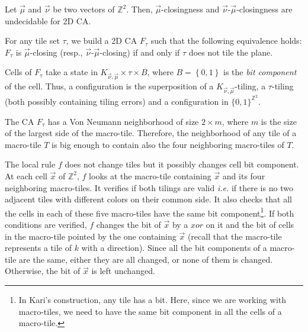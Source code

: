 \documentclass{llncs}
\makeatletter
\newcommand{\ie}{\emph{i.e.}\@\xspace}
\newcommand{\Zgrid}{{\mathbb Z}^2}
\newcommand{\set}[1]{\left\{#1\right\}}
\newcommand{\nn}{\vec\nu}
\newcommand{\mm}{\vec \mu}
\newcommand{\xx}{\vec x}
\makeatother
\begin{document}
\begin{theorem}\label{th:closingundec}
Let $\mm$ and $\nn$ be two vectors of $\Zgrid$. Then, $\mm$-closingness and $\nn$-$\mm$-closingness are undecidable for 2D CA.
\end{theorem}
\proof
For any tile set $\tau$, we build a 2D CA
$F_{\tau}$ such that the following equivalence holds: $F_{\tau}$ is $\mm$-closing
(resp., $\nn$-$\mm$-closing) if and only if $\tau$ does not tile the plane.

Cells of $F_{\tau}$ take a state in $K_{\nn,\mm}\times\tau\times B$, where
$B=\set{0,1}$ is the \emph{bit component} of the cell. Thus, a
configuration is the superposition of a $K_{\nn,\mm}$-tiling, a $\tau$-tiling (both possibly containing tiling errors) and a configuration in $\{0,1\}^{\Zgrid}$.

The CA $F_{\tau}$ has a Von Neumann
neighborhood of size $2\times m$, where $m$ is the size of the largest side of the macro-tile.
Therefore, the neighborhood of any tile of a macro-tile $T$ is big enough
to contain also the four neighboring macro-tiles of $T$.

The local rule $f$ does not change tiles but it possibly changes cell bit component. 
At each cell $\xx$ of $\Zgrid$, $f$ looks at the macro-tile containing $\xx$ and
its four neighboring macro-tiles. It verifies if both tilings are valid
 \ie if there is no two adjacent tiles with different colors on their common side.
 It also checks that all the cells in each of these five macro-tiles have the same bit component\footnote{In Kari's
construction, any tile has a bit. Here, since we are working with macro-tiles, we need to have the same bit component in all the cells of a macro-tile.}.
If both conditions are verified, $f$ changes the bit of $\xx$ 
by a $xor$ on it and the bit of cells in the macro-tile
pointed by the one containing $\xx$ (recall
that the macro-tile represents a tile of $k$ with a direction). Since all the bit
components of a macro-tile are the same, either they are all changed, or
none of them is changed. Otherwise, the bit of $\xx$ is left unchanged.
\end{document}
